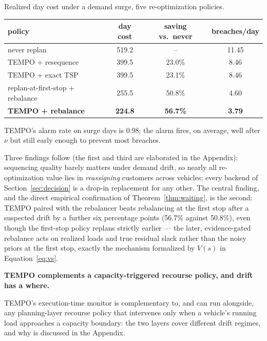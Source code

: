 \documentclass[trsc,dblanonrev]{informs4}
\begin{document}
\begin{table}
\TABLE
{Realized day cost under a demand surge, five re-optimization policies.
\label{tab:replan}}
{\footnotesize\begin{tabular}{@{}lccc@{}}
\toprule
policy & day cost & saving vs.\ never & breaches/day \\
\midrule
never replan                        & 519.2 & --      & 11.45 \\
TEMPO + resequence                  & 399.5 & 23.0\%  & 8.46 \\
TEMPO + exact TSP                   & 399.5 & 23.1\%  & 8.46 \\
replan-at-first-stop + rebalance    & 255.5 & 50.8\%  & 4.60 \\
\textbf{TEMPO + rebalance}          & \textbf{224.8} & \textbf{56.7\%} & \textbf{3.79} \\
\bottomrule
\end{tabular}}
{TEMPO's alarm rate on surge days is 0.98; the alarm fires, on
average, well after $\nu$ but still early enough to prevent most
breaches.}
\end{table}

Three findings follow (the first and third are elaborated in the
Appendix): sequencing quality barely matters under demand drift, so
nearly all re-optimization value lies in \emph{reassigning} customers
across vehicles; every backend of Section~\ref{sec:decision} is a
drop-in replacement for any other. The central finding, and the direct
empirical confirmation of Theorem~\ref{thm:waiting}, is the second:
TEMPO paired with the rebalancer beats rebalancing at the first stop
after a suspected drift by a further six percentage points (56.7\%
against 50.8\%), even though the first-stop policy replans strictly
earlier --- the later, evidence-gated rebalance acts on realized loads
and true residual slack rather than the noisy priors at the first
stop, exactly the mechanism formalized by $V(s)$ in
Equation~\eqref{eq:vs}.

\textbf{TEMPO complements a capacity-triggered recourse policy, and drift has a where.}

TEMPO's execution-time monitor is complementary to, and can run
alongside, any planning-layer recourse policy that intervenes only
when a vehicle's running load approaches a capacity boundary: the two
layers cover different drift regimes, and why is discussed in the
Appendix.
\end{document}
